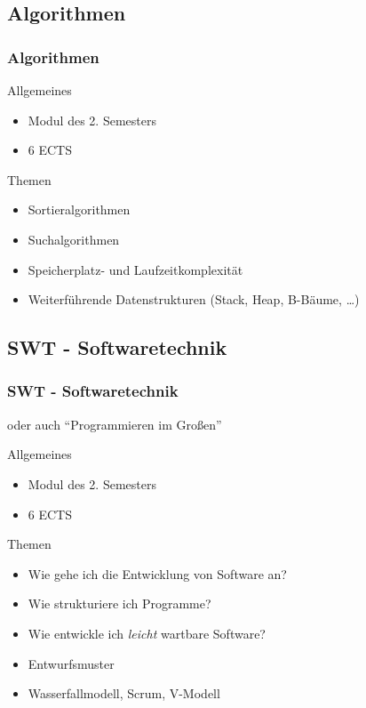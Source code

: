 \documentclass[usepdftitle=false,hyperref={pdfpagelabels=false}]{beamer}
\begin{document}
\subsection{Algorithmen}
\begin{frame}
    \frametitle{Algorithmen}
    \begin{block}{Allgemeines}
      \begin{itemize}
        \item Modul des 2. Semesters
        \item 6 ECTS
      \end{itemize}
    \end{block}
    \begin{block}{Themen}
      \begin{itemize}
        \item Sortieralgorithmen
        \item Suchalgorithmen
        \item Speicherplatz- und Laufzeitkomplexität
        \item Weiterführende Datenstrukturen (Stack, Heap, B-Bäume, \dots)
      \end{itemize}
    \end{block}
\end{frame}

\subsection{SWT - Softwaretechnik}
\begin{frame}
    \frametitle{SWT - Softwaretechnik}
    oder auch "`Programmieren im Großen"'
    \begin{block}{Allgemeines}
      \begin{itemize}
        \item Modul des 2. Semesters
        \item 6 ECTS
      \end{itemize}
    \end{block}
    \begin{block}{Themen}
      \begin{itemize}
        \item Wie gehe ich die Entwicklung von Software an?
        \item Wie strukturiere ich Programme?
        \item Wie entwickle ich \emph{leicht} wartbare Software?
        \item Entwurfsmuster
        \item Wasserfallmodell, Scrum, V-Modell
      \end{itemize}
    \end{block}
\end{frame}
\end{document}
